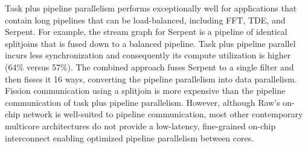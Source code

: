 Task plus pipeline parallelism performs exceptionally well for
applications that contain long pipelines that can be load-balanced,
including FFT, TDE, and Serpent.  For example, the stream graph for
Serpent is a pipeline of identical splitjoins that is fused down to a
balanced pipeline.  Task plus pipeline parallel incurs less
synchronization and consequently its compute utilization is higher
(64\% versus 57\%).  The combined approach fuses Serpent to a single
filter and then fisses it 16 ways, converting the pipeline parallelism
into data parallelism.  Fission communication using a splitjoin is
more expensive than the pipeline communication of task plus pipeline
parallelism.  However, although Raw's on-chip network is well-suited to
pipeline communication, most other contemporary multicore
architectures do not provide a low-latency, fine-grained on-chip
interconnect enabling optimized pipeline parallelism between cores.








